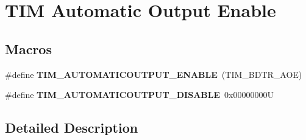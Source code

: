 \hypertarget{group___t_i_m___a_o_e___bit___set___reset}{}\section{T\+IM Automatic Output Enable}
\label{group___t_i_m___a_o_e___bit___set___reset}
\subsection*{Macros}
\begin{DoxyCompactItemize}
\item 
\mbox{\label{group___t_i_m___a_o_e___bit___set___reset_ga09e7f3f768b0f122f13fd47771f07ddf}} 
\#define {\bfseries T\+I\+M\+\_\+\+A\+U\+T\+O\+M\+A\+T\+I\+C\+O\+U\+T\+P\+U\+T\+\_\+\+E\+N\+A\+B\+LE}~(T\+I\+M\+\_\+\+B\+D\+T\+R\+\_\+\+A\+OE)
\item 
\mbox{\label{group___t_i_m___a_o_e___bit___set___reset_ga65b4336dee767fbe8d8cc4f980f6b18e}} 
\#define {\bfseries T\+I\+M\+\_\+\+A\+U\+T\+O\+M\+A\+T\+I\+C\+O\+U\+T\+P\+U\+T\+\_\+\+D\+I\+S\+A\+B\+LE}~0x00000000U
\end{DoxyCompactItemize}


\subsection{Detailed Description}
